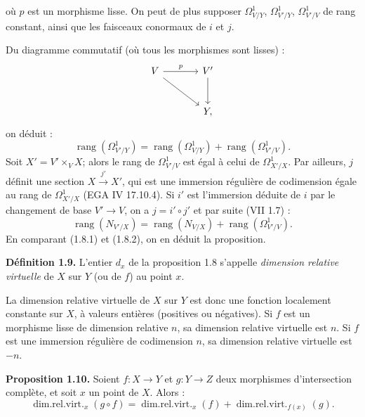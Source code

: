 où $p$ est un
morphisme lisse. On peut de plus supposer $\Omega^1_{V/Y}$, $\Omega^1_{V'/Y}$, $\Omega^1_{V'/V}$ de rang constant, ainsi que les faisceaux conormaux de $i$ et $j$.

Du diagramme commutatif (où tous les morphismes sont lisses) :
\[
\begin{tikzcd}[column sep=large,row sep=large]
V \arrow[r,"p"] \arrow[dr] & V' \arrow[d]\\
& Y,
\end{tikzcd}
\]
on déduit :
\begin{equation}\tag{1.8.1}
\operatorname{rang}(\Omega^1_{V'/Y})=
\operatorname{rang}(\Omega^1_{V/Y})+
\operatorname{rang}(\Omega^1_{V'/V}).
\end{equation}
Soit $X'=V'\times_V X$; alors le rang de $\Omega^1_{V'/V}$ est égal à celui de $\Omega^1_{X'/X}$. Par ailleurs, $j$ définit une section $X\xrightarrow{j'} X'$, qui est une immersion régulière de codimension égale au rang de $\Omega^1_{X'/X}$ (EGA IV 17.10.4). Si $i'$ est l'immersion déduite de $i$ par le changement de base $V'\to V$, on a $j=i'\circ j'$ et par suite (VII 1.7) :
\begin{equation}\tag{1.8.2}
\operatorname{rang}(N_{V'/X})=
\operatorname{rang}(N_{V/X})+
\operatorname{rang}(\Omega^1_{V'/V}).
\end{equation}
En comparant (1.8.1) et (1.8.2), on en déduit la proposition.

\textbf{Définition 1.9.} L'entier $d_x$ de la proposition 1.8 s'appelle \emph{dimension relative virtuelle} de $X$ sur $Y$ (ou de $f$) au point $x$.

La dimension relative virtuelle de $X$ sur $Y$ est donc une fonction localement constante sur $X$, à valeurs entières (positives ou négatives). Si $f$ est un morphisme lisse de dimension relative $n$, sa dimension relative virtuelle est $n$. Si $f$ est une immersion régulière de codimension $n$, sa dimension relative virtuelle est $-n$.

\textbf{Proposition 1.10.} Soient $f:X\to Y$ et $g:Y\to Z$ deux morphismes d'intersection complète, et soit $x$ un point de $X$. Alors :
\[
\operatorname{dim.rel.virt.}_x(g\circ f)=
\operatorname{dim.rel.virt.}_x(f)+
\operatorname{dim.rel.virt.}_{f(x)}(g).
\]
